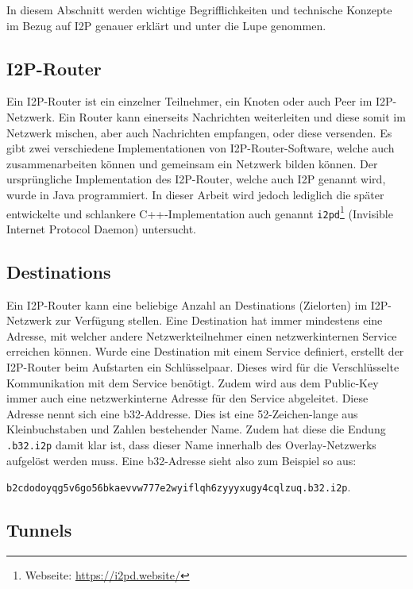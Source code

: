 In diesem Abschnitt werden wichtige Begrifflichkeiten und technische Konzepte im Bezug auf I2P genauer erklärt und unter die Lupe genommen.

\subsection{I2P-Router}\label{sec:router}

Ein I2P-Router ist ein einzelner Teilnehmer, ein Knoten oder auch Peer im I2P-Netzwerk.
Ein Router kann einerseits Nachrichten weiterleiten und diese somit im Netzwerk mischen, aber auch Nachrichten empfangen, oder diese versenden.
Es gibt zwei verschiedene Implementationen von I2P-Router-Software, welche auch zusammenarbeiten können und gemeinsam ein Netzwerk bilden können.
Der ursprüngliche Implementation des I2P-Router, welche auch I2P genannt wird, wurde in Java programmiert.
In dieser Arbeit wird jedoch lediglich die später entwickelte und schlankere C++-Implementation auch genannt \lstinline|i2pd|\footnote{Webseite: \url{https://i2pd.website/}} (Invisible Internet Protocol Daemon) untersucht.

\subsection{Destinations}

Ein I2P-Router kann eine beliebige Anzahl an Destinations (Zielorten) im I2P-Netzwerk zur Verfügung stellen.
Eine Destination hat immer mindestens eine Adresse, mit welcher andere Netzwerkteilnehmer einen netzwerkinternen Service erreichen können.
Wurde eine Destination mit einem Service definiert, erstellt der I2P-Router beim Aufstarten ein Schlüsselpaar.
Dieses wird für die Verschlüsselte Kommunikation mit dem Service benötigt.
Zudem wird aus dem Public-Key immer auch eine netzwerkinterne Adresse für den Service abgeleitet.
Diese Adresse nennt sich eine b32-Addresse.
Dies ist eine 52-Zeichen-lange aus Kleinbuchstaben und Zahlen bestehender Name.
Zudem hat diese die Endung \lstinline|.b32.i2p| damit klar ist, dass dieser Name innerhalb des Overlay-Netzwerks aufgelöst werden muss.
Eine b32-Adresse sieht also zum Beispiel so aus:

\lstinline|b2cdodoyqg5v6go56bkaevvw777e2wyiflqh6zyyyxugy4cqlzuq.b32.i2p|.

\parencite{noauthor_naming_nodate}

\subsection{Tunnels}

